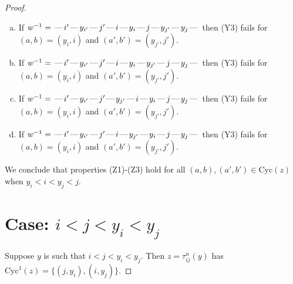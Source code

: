 \documentclass[10pt]{article}
\theoremstyle{definition}
\theoremstyle{definition}
\def\dash{\text{\hspace{0.5mm}---\hspace{0.5mm}}}
\def\Cyc{\mathrm{Cyc}}
\begin{document}
\begin{proof}
\begin{enumerate}
\begin{enumerate}[(a)]
\item If $w^{-1} = \dash i'\dash y_{i'}\dash j'\dash i\dash y_i\dash j\dash y_{j'}\dash y_j\dash $ then (Y3) fails for $(a,b)=(y_i,i)$ and $(a',b')=(y_{j'},j')$.
\item If $w^{-1} = \dash i'\dash y_{i'}\dash j'\dash i\dash y_i\dash y_{j'}\dash j\dash y_j\dash $ then (Y3) fails for $(a,b)=(y_i,i)$ and $(a',b')=(y_{j'},j')$.
\item If $w^{-1} = \dash i'\dash y_{i'}\dash j'\dash y_{j'}\dash i\dash y_i\dash j\dash y_j\dash $ then (Y3) fails for $(a,b)=(y_i,i)$ and $(a',b')=(y_{j'},j')$.
\item If $w^{-1} = \dash i'\dash y_{i'}\dash j'\dash i\dash y_{j'}\dash y_i\dash j\dash y_j\dash $ then (Y3) fails for $(a,b)=(y_i,i)$ and $(a',b')=(y_{j'},j')$.
\end{enumerate}
\end{enumerate}
We conclude that properties (Z1)-(Z3) hold for all 
$(a,b),(a',b') \in \Cyc(z)$ when $y_i < i < y_j < j$.
\section{Case: $i < j < y_i < y_j$}
Suppose $y$ is such that $i < j < y_i < y_j$.
Then $z = \tau^n_{ij}(y)$ has $\Cyc^1(z) = \{(j,y_i),(i,y_j)\}.$

\end{proof}
\end{document}
